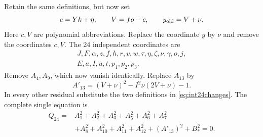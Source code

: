 Retain the same definitions, but now set
\begin{equation}
 c=Yk+\eta,\qquad V=fo-c,
 \qquad y_{\rm old}=V+\nu.
 \label{eq:int24changes}
\end{equation}
Here $c,V$ are polynomial abbreviations.  Replace the coordinate $y$ by
$\nu$ and remove the coordinates $c,V$.  The 24 independent coordinates are
\[
\begin{gathered}
 J,F,\alpha,z,f,h,r,v,w,\tau,\eta,\zeta,\nu,\gamma,o,j,\\
 E,a,I,u,t,p_1,p_2,p_3.
\end{gathered}
\]
Remove $A_4,A_9$, which now vanish identically.  Replace $A_{13}$ by
\begin{equation}
 A'_{13}=(V+\nu)^2-I^2\nu(2V+\nu)-1.
 \label{eq:int24aux}
\end{equation}
In every other residual substitute the two definitions in
\eqref{eq:int24changes}.  The complete single equation is
\begin{equation}
 \boxed{\begin{aligned}
 Q_{24}={}&A_1^2+A_2^2+A_3^2+A_5^2+A_6^2+A_7^2\\
         &+A_8^2+A_{10}^2+A_{11}^2+A_{12}^2+(A'_{13})^2+B_*^2=0.
 \end{aligned}}
 \label{eq:int24}
\end{equation}

